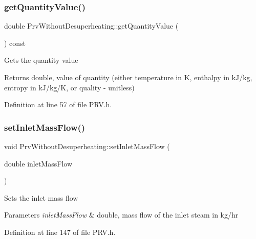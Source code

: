 \subsubsection{\texorpdfstring{get\+Quantity\+Value()}{getQuantityValue()}\hspace{0.1cm}{\footnotesize\ttfamily [3/3]}}
{\footnotesize\ttfamily double Prv\+Without\+Desuperheating\+::get\+Quantity\+Value (\begin{DoxyParamCaption}{ }\end{DoxyParamCaption}) const\hspace{0.3cm}{\ttfamily [inline]}}

Gets the quantity value

\begin{DoxyReturn}{Returns}
double, value of quantity (either temperature in K, enthalpy in k\+J/kg, entropy in k\+J/kg/K, or quality -\/ unitless) 
\end{DoxyReturn}


Definition at line 57 of file P\+R\+V.\+h.

\mbox{\label{class_prv_without_desuperheating_abeccff2dc91144452b34ca343ee63fa7}} 
\subsubsection{\texorpdfstring{set\+Inlet\+Mass\+Flow()}{setInletMassFlow()}\hspace{0.1cm}{\footnotesize\ttfamily [1/3]}}
{\footnotesize\ttfamily void Prv\+Without\+Desuperheating\+::set\+Inlet\+Mass\+Flow (\begin{DoxyParamCaption}\item[{double}]{inlet\+Mass\+Flow }\end{DoxyParamCaption})\hspace{0.3cm}{\ttfamily [inline]}}

Sets the inlet mass flow


\begin{DoxyParams}{Parameters}
{\em inlet\+Mass\+Flow} & double, mass flow of the inlet steam in kg/hr \\
\hline
\end{DoxyParams}


Definition at line 147 of file P\+R\+V.\+h.

